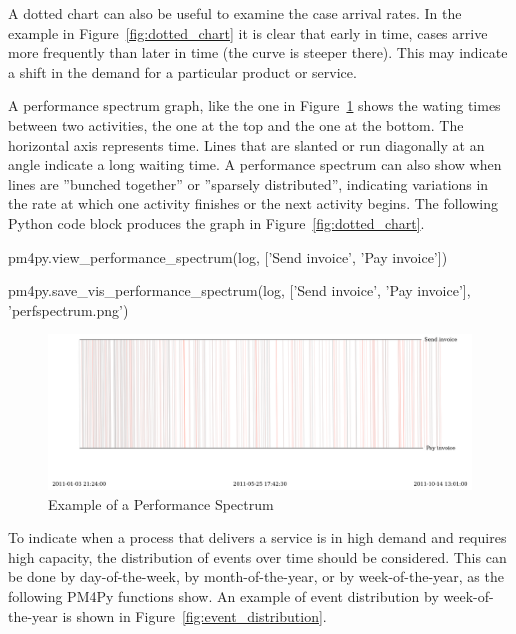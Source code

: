 A dotted chart can also be useful to examine the case arrival rates. In the example in Figure~\ref{fig:dotted_chart} it is clear that early in time, cases arrive more frequently than later in time (the curve is steeper there). This may indicate a shift in the demand for a particular product or service. 

A performance spectrum graph, like the one in Figure~\ref{fig:perf_spectrum} shows the wating times between two activities, the one at the top and the one at the bottom. The horizontal axis represents time. Lines that are slanted or run diagonally at an angle indicate a long waiting time. A performance spectrum can also show when lines are ''bunched together'' or ''sparsely distributed'', indicating variations in the rate at which one activity finishes or the next activity begins. The following Python code block produces the graph in Figure~\ref{fig:dotted_chart}.

\begin{samepage}
\begin{pythoncode}
pm4py.view_performance_spectrum(log,
    ['Send invoice', 'Pay invoice'])

pm4py.save_vis_performance_spectrum(log,
    ['Send invoice', 'Pay invoice'],
    'perfspectrum.png') 
\end{pythoncode}
\end{samepage}

\begin{figure}
\centering
\includegraphics[width=.9\textwidth]{perfspectrum.png}
\caption{Example of a Performance Spectrum}
\label{fig:perf_spectrum}
\end{figure}

To indicate when a process that delivers a service is in high demand and requires high capacity, the distribution of events over time should be considered. This can be done by day-of-the-week, by month-of-the-year, or by week-of-the-year, as the following PM4Py functions show. An example of event distribution by week-of-the-year is shown in Figure~\ref{fig:event_distribution}.

